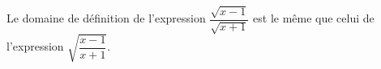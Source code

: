 Le domaine de définition de l'expression $\dfrac{\sqrt{x-1}}{\sqrt{x+1}}$ est le même que celui de l'expression $\sqrt{\dfrac{x-1}{x+1}}$.

\begin{reponses}
\end{reponses}

